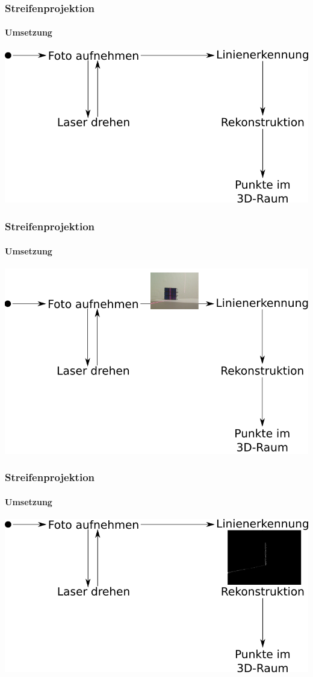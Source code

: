 \documentclass{beamer}
\begin{document}
\begin{frame}
	\frametitle{Streifenprojektion}
	\framesubtitle{Umsetzung}

	
	\includegraphics[width=\linewidth]{includes/blockbild.png}

\end{frame}
\begin{frame}
	\frametitle{Streifenprojektion}
	\framesubtitle{Umsetzung}

	
	\includegraphics[width=\linewidth]{includes/blockbild_cap.png}

\end{frame}
\begin{frame}
	\frametitle{Streifenprojektion}
	\framesubtitle{Umsetzung}

	
	\includegraphics[width=\linewidth]{includes/blockbild_line.png}

\end{frame}
\end{document}

